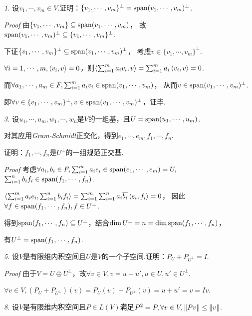 \textit{1.}
设\(v_1,\cdots,v_m \in V\).证明：\(\{v_1,\cdots,v_m\}^\bot=\mathrm{span}(v_1,\cdots,v_m)^\bot\).

\textit{Proof}
由\(\{v_1,\cdots,v_m\} \subseteq \mathrm{span}(v_1,\cdots,v_m)\)，
故\(\mathrm{span}(v_1,\cdots,v_m)^\bot \subseteq \{v_1,\cdots,v_m\}^\bot\).

下证\(\{v_1,\cdots,v_m\}^\bot \subseteq \mathrm{span}(v_1,\cdots,v_m)^\bot\)，
考虑\(v \in \{v_1,\cdots,v_m\}^\bot\).

\(\forall i=1,\cdots,m,\left\langle v_i,v \right\rangle=0\)，则\(\left\langle \sum_{i=1}^m a_iv_i,v \right\rangle=\sum_{i=1}^m a_i\left\langle v_i,v \right\rangle=0\).

而\(\forall a_1,\cdots,a_m \in F,\sum_{i=1}^m a_iv_i \in \mathrm{span}(v_1,\cdots,v_m)\)，
从而\(v \in \mathrm{span}(v_1,\cdots,v_m)^\bot\).

即\(\forall v \in \{v_1,\cdots,v_m\}^\bot,v \in \mathrm{span}(v_1,\cdots,v_m)^\bot\)，证毕.

\hspace*{\fill}

\textit{3.}
设\(u_1,\cdots,u_m,w_1,\cdots,w_n\)是\(V\)的一组基，且\(U=\mathrm{span}(u_1,\cdots,u_m)\).

对其应用\textit{Gram-Schmidt}{\kaishu 正交化}，得到\(e_1,\cdots,e_m,f_1,\cdots,f_n\).

证明：\(f_1,\cdots,f_n\)是\(U^\bot\)的一组规范正交基.

\textit{Proof}
考虑\(\forall a_i,b_i \in F,\sum_{i=1}^m a_ie_i \in \mathrm{span}(e_1,\cdots,e_m)=U,\)
\(\sum_{i=1}^n b_if_i \in \mathrm{span}(f_1,\cdots,f_n)\).

\(\left\langle \sum_{i=1}^m a_ie_i,\sum_{i=1}^n b_if_i \right\rangle=\sum_{i=1}^m \sum_{i=1}^n a_i\overline{b_i} \left\langle e_i,f_i \right\rangle=0\)，
因此\(\forall f \in \mathrm{span}(f_1,\cdots,f_n), f\in U^\bot\).

得到\(\mathrm{span}(f_1,\cdots,f_n) \subseteq U^\bot\)，结合\(\dim U^\bot=n=\dim \mathrm{span}(f_1,\cdots,f_n)\)，

有\(U^\bot=\mathrm{span}(f_1,\cdots,f_n)\).

\hspace*{\fill}

\textit{5.}
设\(V\)是有限维内积空间且\(U\)是\(V\)的一个子空间.证明：\(P_U+P_{U^\bot}=I\).

\textit{Proof}
由于\(V=U \oplus U^\bot\)，故\(\forall v \in V,v=u+u',u \in U,u' \in U^\bot\).

\(\forall v \in V,(P_U+P_{U^\bot})(v)=P_U(v)+P_{U^\bot}(v)=u+u'=v=Iv\).

\hspace*{\fill}

\textit{8.}
设\(V\)是有限维内积空间且\(P \in L(V)\)满足\(P^2=P,\forall v \in V,\left\lVert Pv \right\rVert \leq \left\lVert v \right\rVert\).


